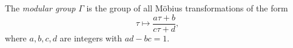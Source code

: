 The \textit{modular group} $\Gamma$ is the group of all M\"obius transformations of the form
$$\tau \mapsto \frac{a\tau + b}{c\tau + d},$$
where $a, b, c, d$ are integers with $ad - bc = 1$.
